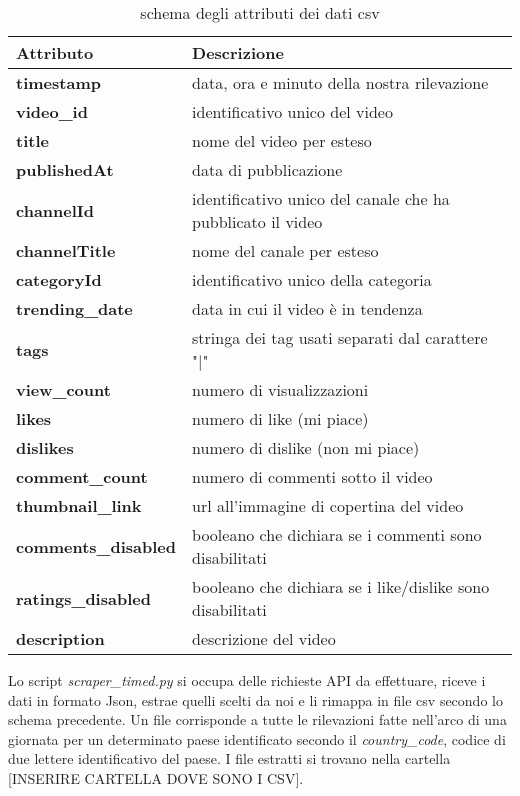 \documentclass[10pt, a4paper,openany]{article}
\begin{document}
\begin{table}[H]
	\centering
	\begin{tabular}{l|l}
		\textbf{Attributo} & \textbf{Descrizione} \\
		\hline
		\textbf{timestamp} & data, ora e minuto della nostra rilevazione \\\hline
		\textbf{video\_id} & identificativo unico del video\\\hline
		\textbf{title} & nome del video per esteso\\\hline
		\textbf{publishedAt} & data di pubblicazione\\\hline
		\textbf{channelId} & identificativo unico del canale che ha pubblicato il video\\\hline
		\textbf{channelTitle} & nome del canale per esteso\\\hline
		\textbf{categoryId} & identificativo unico della categoria\\\hline
		\textbf{trending\_date} & data in cui il video è in tendenza\\\hline
		\textbf{tags} & stringa dei tag usati separati dal carattere "|"\\\hline
		\textbf{view\_count} & numero di visualizzazioni\\\hline
		\textbf{likes} & numero di like (mi piace)\\\hline
		\textbf{dislikes} & numero di dislike (non mi piace)\\\hline
		\textbf{comment\_count} & numero di commenti sotto il video\\\hline
		\textbf{thumbnail\_link} & url all'immagine di copertina del video\\\hline
		\textbf{comments\_disabled} & booleano che dichiara se i commenti sono disabilitati\\\hline
		\textbf{ratings\_disabled} & booleano che dichiara se i like/dislike sono disabilitati\\\hline
		\textbf{description} & descrizione del video\\
		\hline
	\end{tabular}
	\caption{schema degli attributi dei dati csv}
\end{table}

Lo script \textit{scraper\_timed.py} si occupa delle richieste API da effettuare, riceve i dati in formato Json, estrae quelli scelti da noi e li rimappa in file csv secondo lo schema precedente. Un file corrisponde a tutte le rilevazioni fatte nell'arco di una giornata per un determinato paese identificato secondo il \textit{country\_code}, codice di due lettere identificativo del paese. I file estratti si trovano nella cartella [INSERIRE CARTELLA DOVE SONO I CSV].
\end{document}
